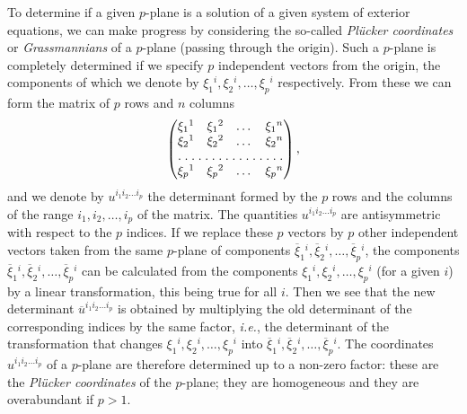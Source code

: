\vspace{12pt}\fsec To determine if a given $p$-plane is a solution of a given system of exterior equations, we can make progress by considering the so-called \emph{Pl\"ucker coordinates} or  \emph{Grassmannians} of a $p$-plane (passing through the origin). Such a $p$-plane is completely determined if we specify $p$ independent vectors from the origin, the components of which we denote by $\xi_{1}{}^{i},\xi_{2}{}^{i},\dots,\xi_{p}{}^{i}$ respectively. From these we can form the matrix of $p$ rows and $n$ columns
\[
\begin{pmatrix}
  \xi_{1}{}^{1}&\xi_{1}{}^{2}&\dots&\xi_{1}{}^{n}\\
  \xi_{2}{}^{1}&\xi_{2}{}^{2}&\dots&\xi_{2}{}^{n}\\
  \hdotsfor[1.5]{4}\\
  \xi_{p}{}^{1}&\xi_{p}{}^{2}&\dots&\xi_{p}{}^{n}\\
\end{pmatrix},
\]
and we denote by $u^{i_{1}i_{2}\dots i_{p}}$ the determinant formed by the $p$ rows and the columns of the range $i_{1},i_{2},\dots,i_{p}$ of the matrix. The quantities $u^{i_{1}i_{2}\dots i_{p}}$ are antisymmetric with respect to the $p$ indices. If we replace these $p$ vectors by $p$ other independent vectors taken from the same $p$-plane of components $\overline\xi_{1}{}^{i},\overline\xi_{2}{}^{i},\dots,\overline\xi_{p}{}^{i}$, the components $\overline\xi_{1}{}^{i},\overline\xi_{2}{}^{i},\dots,\overline\xi_{p}{}^{i}$ can be calculated from the components $\xi_{1}{}^{i},\xi_{2}{}^{i},\dots,\xi_{p}{}^{i}$ (for a given $i$) by a linear transformation, this being true for all $i$. Then we see that the new determinant $\overline u^{i_{1}i_{2}\dots i_{p}}$ is obtained by multiplying the old determinant of the corresponding indices by the same factor, \emph{i.e.}, the determinant of the transformation that changes $\xi_{1}{}^{i},\xi_{2}{}^{i},\dots,\xi_{p}{}^{i}$ into $\overline\xi_{1}{}^{i},\overline\xi_{2}{}^{i},\dots,\overline\xi_{p}{}^{i}$. The coordinates $u^{i_{1}i_{2}\dots i_{p}}$ of a $p$-plane are therefore determined up to a non-zero factor: these are  the \emph{Pl\"ucker coordinates} of the $p$-plane; they are homogeneous and they are overabundant if $p>1$.

